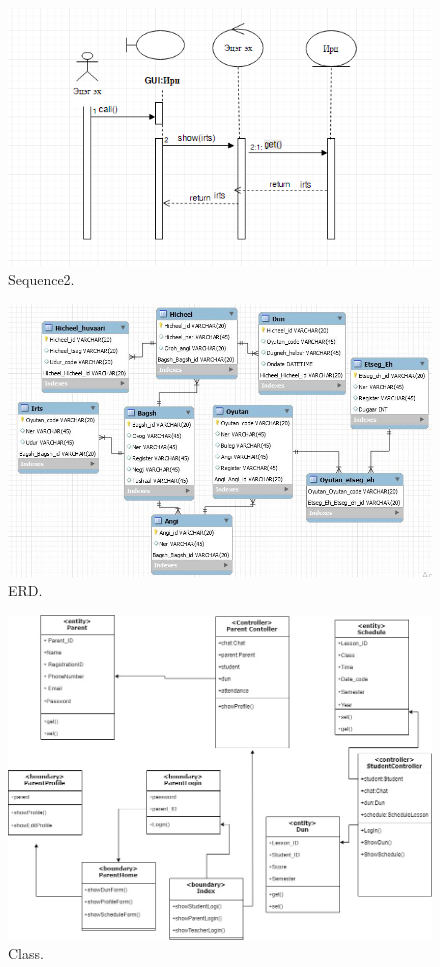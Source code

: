 \documentclass[12pt]{article}
\begin{document}
\begin{figure}
			\caption{Sequence2.}
	\label{fig:s2}
	\includegraphics[width=\linewidth]{S2.png}
\end{figure}
\begin{figure}	
			\caption{ERD.}
	\label{fig:erd}
	\includegraphics[width=\linewidth]{ParentERD.jpg}
\end{figure}
\begin{figure}	
			\caption{Class.}
	\label{fig:class}
	\includegraphics[width=\linewidth]{class.jpg}
\end{figure}	
\end{document}
